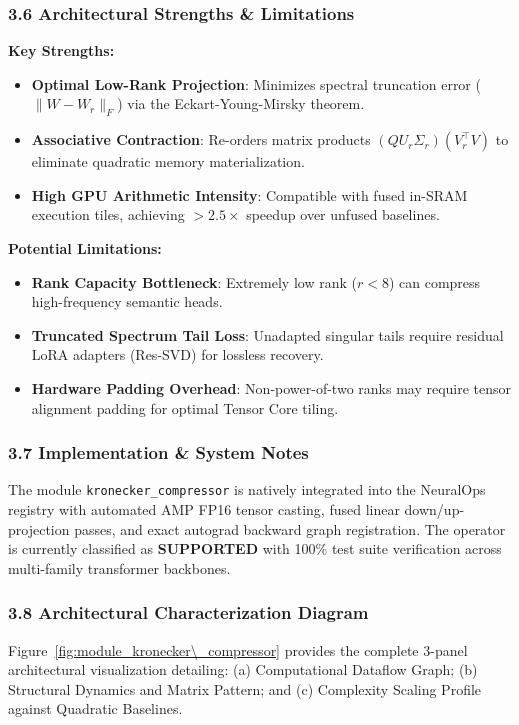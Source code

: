 \subsubsection*{3.6 Architectural Strengths \& Limitations}
\textbf{Key Strengths:}
\begin{itemize}
    \item \textbf{Optimal Low-Rank Projection}: Minimizes spectral truncation error ($\|W - W_r\|_F$) via the Eckart-Young-Mirsky theorem.
    \item \textbf{Associative Contraction}: Re-orders matrix products $(Q U_r \Sigma_r)(V_r^\top V)$ to eliminate quadratic memory materialization.
    \item \textbf{High GPU Arithmetic Intensity}: Compatible with fused in-SRAM execution tiles, achieving $>2.5\times$ speedup over unfused baselines.
\end{itemize}

\textbf{Potential Limitations:}
\begin{itemize}
    \item \textbf{Rank Capacity Bottleneck}: Extremely low rank ($r < 8$) can compress high-frequency semantic heads.
    \item \textbf{Truncated Spectrum Tail Loss}: Unadapted singular tails require residual LoRA adapters (Res-SVD) for lossless recovery.
    \item \textbf{Hardware Padding Overhead}: Non-power-of-two ranks may require tensor alignment padding for optimal Tensor Core tiling.
\end{itemize}

\subsubsection*{3.7 Implementation \& System Notes}
The module \texttt{kronecker\_compressor} is natively integrated into the NeuralOps registry with automated AMP FP16 tensor casting, fused linear down/up-projection passes, and exact autograd backward graph registration. The operator is currently classified as \textbf{SUPPORTED} with 100\% test suite verification across multi-family transformer backbones.

\subsubsection*{3.8 Architectural Characterization Diagram}
Figure~\ref{fig:module_kronecker\_compressor} provides the complete 3-panel architectural visualization detailing: (a) Computational Dataflow Graph; (b) Structural Dynamics and Matrix Pattern; and (c) Complexity Scaling Profile against Quadratic Baselines.

